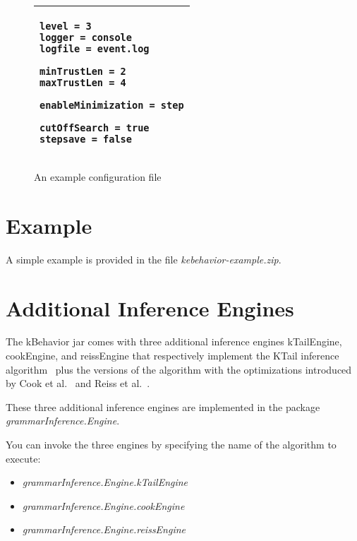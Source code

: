 \begin{center}



\begin{figure}[h]



\begin{tabular}{|p{12cm}|}
\hline
\begin{minipage}{12cm}
\begin{verbatim}
level = 3
logger = console
logfile = event.log

minTrustLen = 2
maxTrustLen = 4

enableMinimization = step

cutOffSearch = true
stepsave = false
\end{verbatim}
\end{minipage}\\

\hline
\end{tabular}
\caption{An example configuration file}
\label{fig:conf}
\end{figure}

\end{center}

\clearpage

\section{Example}

A simple example is provided in the file \emph{kebehavior-example.zip}.

\section{Additional Inference Engines}

The kBehavior jar comes with three additional inference engines kTailEngine, cookEngine, and reissEngine that respectively implement the KTail inference algorithm~\cite{Bierman:KTAIL:TC:1972} plus the versions of the algorithm with the optimizations introduced by Cook et al.~\cite{Cook:DiscoveringModels:TOSEM:1998} and Reiss et al.~\cite{RenierisASE2003}.

These three additional inference engines are implemented in the package \textit{grammarInference.Engine}.

You can invoke the three engines by specifying the name of the algorithm to execute: 
\begin{itemize}
\item \emph{grammarInference.Engine.kTailEngine}
\item \emph{grammarInference.Engine.cookEngine}
\item \emph{grammarInference.Engine.reissEngine}
\end{itemize}

